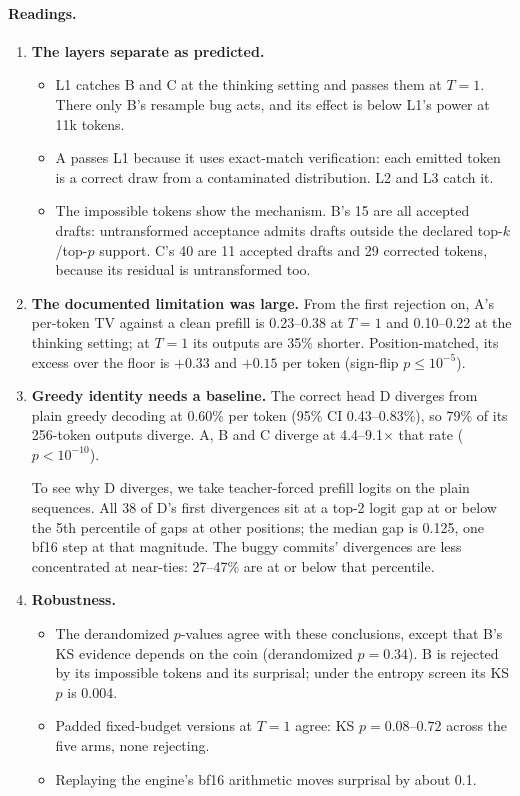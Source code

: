 \documentclass[10pt]{article}
\theoremstyle{remark}
\begin{document}
\paragraph{Readings.}
\begin{enumerate}
\item \textbf{The layers separate as predicted.}
  \begin{itemize}
  \item L1 catches B and C at the thinking setting and passes them at $T{=}1$. There only B's resample bug acts, and its effect is below L1's power at 11k tokens.
  \item A passes L1 because it uses exact-match verification: each emitted token is a correct draw from a contaminated distribution. L2 and L3 catch it.
  \item The impossible tokens show the mechanism. B's 15 are all accepted drafts: untransformed acceptance admits drafts outside the declared top-$k$/top-$p$ support. C's 40 are 11 accepted drafts and 29 corrected tokens, because its residual is untransformed too.
  \end{itemize}
\item \textbf{The documented limitation was large.} From the first rejection on, A's per-token TV against a clean prefill is 0.23--0.38 at $T{=}1$ and 0.10--0.22 at the thinking setting; at $T{=}1$ its outputs are 35\% shorter. Position-matched, its excess over the floor is $+0.33$ and $+0.15$ per token (sign-flip $p\le10^{-5}$).
\item \textbf{Greedy identity needs a baseline.} The correct head D diverges from plain greedy decoding at 0.60\% per token (95\% CI 0.43--0.83\%), so 79\% of its 256-token outputs diverge. A, B and C diverge at 4.4--9.1$\times$ that rate ($p<10^{-10}$).

  To see why D diverges, we take teacher-forced prefill logits on the plain sequences. All 38 of D's first divergences sit at a top-2 logit gap at or below the 5th percentile of gaps at other positions; the median gap is 0.125, one bf16 step at that magnitude. The buggy commits' divergences are less concentrated at near-ties: 27--47\% are at or below that percentile.
\item \textbf{Robustness.}
  \begin{itemize}
  \item The derandomized $p$-values agree with these conclusions, except that B's KS evidence depends on the coin (derandomized $p=0.34$). B is rejected by its impossible tokens and its surprisal; under the entropy screen its KS $p$ is 0.004.
  \item Padded fixed-budget versions at $T{=}1$ agree: KS $p=0.08$--$0.72$ across the five arms, none rejecting.
  \item Replaying the engine's bf16 arithmetic moves surprisal by about 0.1.
  \end{itemize}
\end{enumerate}
\end{document}
